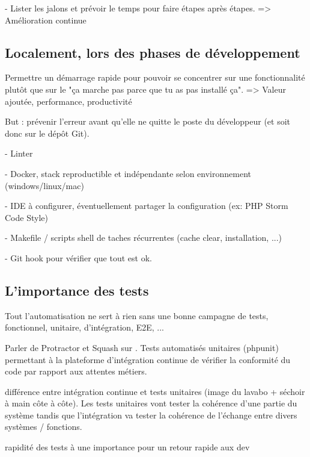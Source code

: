 - Lister les jalons et prévoir le temps pour faire étapes après étapes. => Amélioration continue

\subsection{Localement, lors des phases de développement}


Permettre un démarrage rapide pour pouvoir se concentrer sur une fonctionnalité plutôt que sur le "ça marche pas parce que tu as pas installé ça". => Valeur ajoutée, performance, productivité

But : prévenir l'erreur avant qu'elle ne quitte le poste du développeur (et soit donc sur le dépôt Git).

-  Linter

-  Docker, stack reproductible et indépendante selon environnement (windows/linux/mac) 

- IDE à configurer, éventuellement partager la configuration (ex: PHP Storm Code Style)

-  Makefile / scripts shell de taches récurrentes (cache clear, installation, ...)

- Git hook pour vérifier que tout est ok.


\subsection{L'importance des tests}


Tout l'automatisation ne sert à rien sans une bonne campagne de tests, fonctionnel, unitaire, d'intégration, E2E, ...

Parler de Protractor et Squash sur \bv. Tests automatisés unitaires (phpunit) permettant à la plateforme d'intégration continue de vérifier la conformité du code par rapport aux attentes métiers.

différence entre intégration continue et tests unitaires (image du lavabo + séchoir à main côte à côte). Les tests unitaires vont tester la cohérence d'une partie du système tandis que l'intégration va tester la cohérence de l'échange entre divers systèmes / fonctions.

rapidité des tests à une importance pour un retour rapide aux dev

